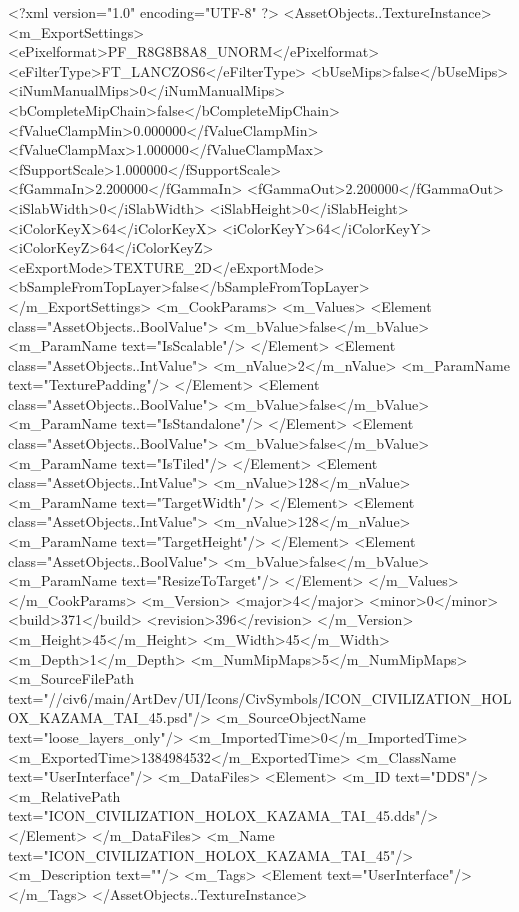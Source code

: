 <?xml version="1.0" encoding="UTF-8" ?>
<AssetObjects..TextureInstance>
	<m_ExportSettings>
		<ePixelformat>PF_R8G8B8A8_UNORM</ePixelformat>
		<eFilterType>FT_LANCZOS6</eFilterType>
		<bUseMips>false</bUseMips>
		<iNumManualMips>0</iNumManualMips>
		<bCompleteMipChain>false</bCompleteMipChain>
		<fValueClampMin>0.000000</fValueClampMin>
		<fValueClampMax>1.000000</fValueClampMax>
		<fSupportScale>1.000000</fSupportScale>
		<fGammaIn>2.200000</fGammaIn>
		<fGammaOut>2.200000</fGammaOut>
		<iSlabWidth>0</iSlabWidth>
		<iSlabHeight>0</iSlabHeight>
		<iColorKeyX>64</iColorKeyX>
		<iColorKeyY>64</iColorKeyY>
		<iColorKeyZ>64</iColorKeyZ>
		<eExportMode>TEXTURE_2D</eExportMode>
		<bSampleFromTopLayer>false</bSampleFromTopLayer>
	</m_ExportSettings>
	<m_CookParams>
		<m_Values>
			<Element class="AssetObjects..BoolValue">
				<m_bValue>false</m_bValue>
				<m_ParamName text="IsScalable"/>
			</Element>
			<Element class="AssetObjects..IntValue">
				<m_nValue>2</m_nValue>
				<m_ParamName text="TexturePadding"/>
			</Element>
			<Element class="AssetObjects..BoolValue">
				<m_bValue>false</m_bValue>
				<m_ParamName text="IsStandalone"/>
			</Element>
			<Element class="AssetObjects..BoolValue">
				<m_bValue>false</m_bValue>
				<m_ParamName text="IsTiled"/>
			</Element>
			<Element class="AssetObjects..IntValue">
				<m_nValue>128</m_nValue>
				<m_ParamName text="TargetWidth"/>
			</Element>
			<Element class="AssetObjects..IntValue">
				<m_nValue>128</m_nValue>
				<m_ParamName text="TargetHeight"/>
			</Element>
			<Element class="AssetObjects..BoolValue">
				<m_bValue>false</m_bValue>
				<m_ParamName text="ResizeToTarget"/>
			</Element>
		</m_Values>
	</m_CookParams>
	<m_Version>
		<major>4</major>
		<minor>0</minor>
		<build>371</build>
		<revision>396</revision>
	</m_Version>
	<m_Height>45</m_Height>
	<m_Width>45</m_Width>
	<m_Depth>1</m_Depth>
	<m_NumMipMaps>5</m_NumMipMaps>
	<m_SourceFilePath text="//civ6/main/ArtDev/UI/Icons/CivSymbols/ICON_CIVILIZATION_HOLOX_KAZAMA_TAI_45.psd"/>
	<m_SourceObjectName text="loose_layers_only"/>
	<m_ImportedTime>0</m_ImportedTime>
	<m_ExportedTime>1384984532</m_ExportedTime>
	<m_ClassName text="UserInterface"/>
	<m_DataFiles>
		<Element>
			<m_ID text="DDS"/>
			<m_RelativePath text="ICON_CIVILIZATION_HOLOX_KAZAMA_TAI_45.dds"/>
		</Element>
	</m_DataFiles>
	<m_Name text="ICON_CIVILIZATION_HOLOX_KAZAMA_TAI_45"/>
	<m_Description text=""/>
	<m_Tags>
		<Element text="UserInterface"/>
	</m_Tags>
</AssetObjects..TextureInstance>

